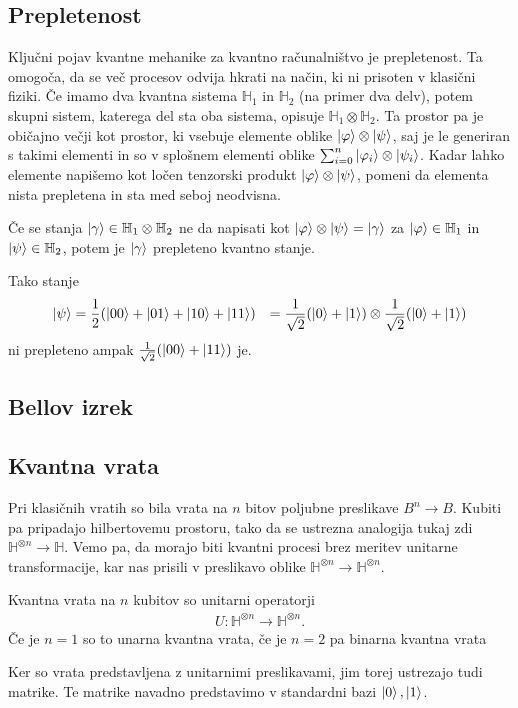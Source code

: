 \documentclass[mat1]{fmfdelo}
\newcommand{\Hb}{\mathbb H}
\begin{document}
\subsection{Prepletenost}
Ključni pojav kvantne mehanike za kvantno računalništvo je prepletenost. Ta omogoča, da se več procesov odvija hkrati na način, ki ni prisoten v klasični fiziki. Če imamo dva kvantna sistema \(\Hb_1\) in \(\Hb_2\) (na primer dva delv), potem skupni sistem, katerega del sta oba sistema, opisuje \(\Hb_1\otimes\Hb_2\). Ta prostor pa je običajno večji kot prostor, ki vsebuje elemente oblike \(\ket\varphi\otimes\ket\psi\), saj je le generiran s takimi elementi in so v splošnem elementi oblike \(\sum_{i=0}^n\ket{\varphi_i}\otimes\ket{\psi_i}\). Kadar lahko elemente napišemo kot ločen tenzorski produkt \(\ket\varphi\otimes\ket\psi\), pomeni da elementa nista prepletena in sta med seboj neodvisna.
\begin{definicija}
    Če se stanja \(\ket\gamma\in \Hb_1\otimes\Hb_2\) ne da napisati kot \(\ket\varphi\otimes\ket\psi = \ket\gamma\) za \(\ket\varphi\in\Hb_1\) in \(\ket\psi\in\Hb_2\), potem je \(\ket\gamma\) prepleteno kvantno stanje.
\end{definicija}
Tako stanje
\begin{align*}
    \ket\psi &=  \frac12(\ket{00}+\ket{01}+\ket{10}+\ket{11})
    &= \frac{1}{\sqrt2}(\ket0+\ket1) \otimes \frac{1}{\sqrt2}(\ket0+\ket1) 
\end{align*}
ni prepleteno ampak \(\frac{1}{\sqrt2}(\ket{00}+\ket{11})\) je.
\subsection{Bellov izrek}
\subsection{Kvantna vrata} Pri klasičnih vratih so bila vrata na \(n\) bitov poljubne preslikave \(B^n\to B\). Kubiti pa pripadajo hilbertovemu prostoru, tako da se ustrezna analogija tukaj zdi \(\Hb^{\otimes n}\to \Hb\). Vemo pa, da morajo biti kvantni procesi brez meritev unitarne transformacije, kar nas prisili v preslikavo oblike \(\Hb^{\otimes n}\to \Hb^{\otimes n}\).
\begin{definicija}
    Kvantna vrata na \(n\) kubitov so unitarni operatorji
    \begin{align*}
        U:\Hb^{\otimes n}\to \Hb^{\otimes n}.
    \end{align*}
    Če je \(n=1\) so to unarna kvantna vrata, če je \(n=2\) pa binarna kvantna vrata \cite[Definicija 5.7]{mathforqm}
\end{definicija}
Ker so vrata predstavljena z unitarnimi preslikavami, jim torej ustrezajo tudi matrike. Te matrike navadno predstavimo v standardni bazi \(\ket0, \ket1\).
\end{document}
